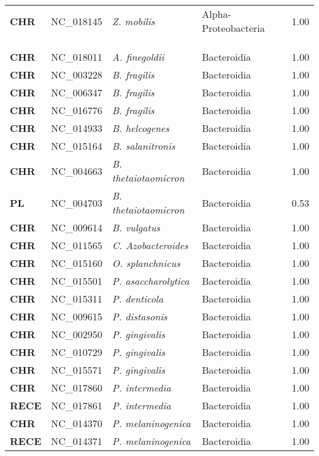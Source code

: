 \begin{adjustwidth}{-3cm}{2cm}
{\begin{supertabular}{>{\bfseries}l|p{0.1\textwidth}p{0.14\textwidth}l|l}
CHR & NC\_018145 & \textit{Z. mobilis} & Alpha-Proteobacteria & 1.00\\
\\
\\
\hline\\
CHR & NC\_018011 & \textit{A. finegoldii} & Bacteroidia & 1.00\\
CHR & NC\_003228 & \textit{B. fragilis} & Bacteroidia & 1.00\\
CHR & NC\_006347 & \textit{B. fragilis} & Bacteroidia & 1.00\\
CHR & NC\_016776 & \textit{B. fragilis} & Bacteroidia & 1.00\\
CHR & NC\_014933 & \textit{B. helcogenes} & Bacteroidia & 1.00\\
CHR & NC\_015164 & \textit{B. salanitronis} & Bacteroidia & 1.00\\
CHR & NC\_004663 & \textit{B. thetaiotaomicron} & Bacteroidia & 1.00\\
PL & NC\_004703 & \textit{B. thetaiotaomicron} & Bacteroidia & 0.53\\
CHR & NC\_009614 & \textit{B. vulgatus} & Bacteroidia & 1.00\\
CHR & NC\_011565 & \textit{C. Azobacteroides} & Bacteroidia & 1.00\\
CHR & NC\_015160 & \textit{O. splanchnicus} & Bacteroidia & 1.00\\
CHR & NC\_015501 & \textit{P. asaccharolytica} & Bacteroidia & 1.00\\
CHR & NC\_015311 & \textit{P. denticola} & Bacteroidia & 1.00\\
CHR & NC\_009615 & \textit{P. distasonis} & Bacteroidia & 1.00\\
CHR & NC\_002950 & \textit{P. gingivalis} & Bacteroidia & 1.00\\
CHR & NC\_010729 & \textit{P. gingivalis} & Bacteroidia & 1.00\\
CHR & NC\_015571 & \textit{P. gingivalis} & Bacteroidia & 1.00\\
CHR & NC\_017860 & \textit{P. intermedia} & Bacteroidia & 1.00\\
RECE & NC\_017861 & \textit{P. intermedia} & Bacteroidia & 1.00\\
CHR & NC\_014370 & \textit{P. melaninogenica} & Bacteroidia & 1.00\\
RECE & NC\_014371 & \textit{P. melaninogenica} & Bacteroidia & 1.00\\

\end{supertabular}}
\end{adjustwidth}
